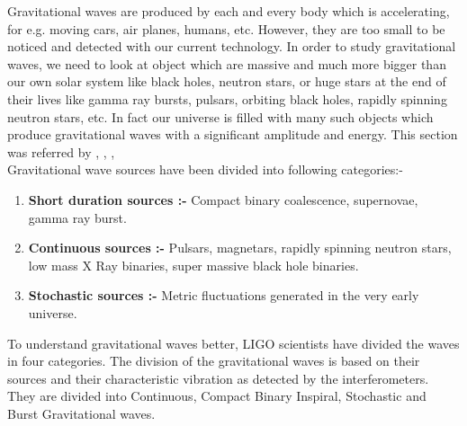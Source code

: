 \hspace{0.6 cm} Gravitational waves are produced by each and every body which is accelerating, for e.g. moving cars, air planes, humans, etc. However, they are too small to be noticed and detected with our current technology. In order to study gravitational waves, we need to look at object which are massive and much more bigger than our own solar system like black holes, neutron stars, or huge stars at the end of their lives like gamma ray bursts, pulsars, orbiting black holes, rapidly spinning neutron stars, etc. In fact our universe is filled with many such objects which produce gravitational waves with a significant amplitude and energy. This section was referred by \cite{Allen1996TheSG}, \cite{Neutron_wiki}, \cite{Linear}, \cite{sounds_of_space} \\

\noindent Gravitational wave sources have been divided into following categories:-

\begin{enumerate}
    \item \textbf{Short duration sources :-} Compact binary coalescence, supernovae, gamma ray burst.

    \item \textbf{Continuous sources :-} Pulsars, magnetars, rapidly spinning neutron stars, low mass X Ray binaries, super massive black hole binaries.

    \item \textbf{Stochastic sources :-} Metric fluctuations generated in the very early universe.
\end{enumerate}

\noindent To understand gravitational waves better, LIGO scientists have divided the waves in four categories. The division of the gravitational waves is based on their sources and their characteristic vibration as detected by the interferometers.  They are divided into Continuous, Compact Binary Inspiral, Stochastic and Burst Gravitational waves.

